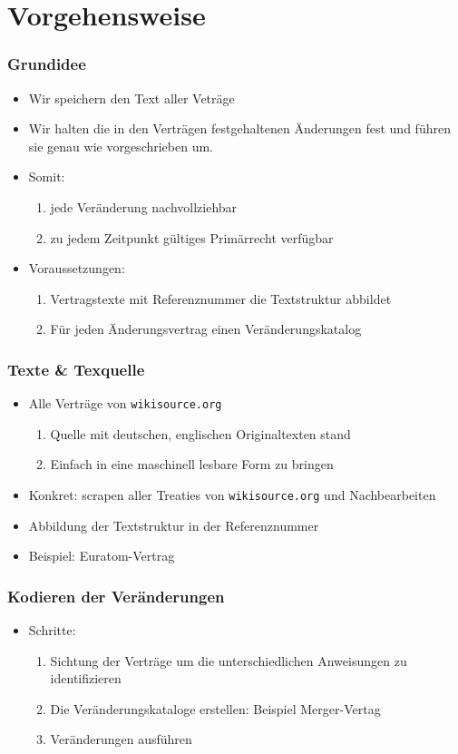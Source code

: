 \documentclass[xcolor=dvipsnames]{beamer} %
\begin{document}
\section{Vorgehensweise}
\begin{frame}
  \frametitle{Grundidee}
  \begin{itemize}
  \item Wir speichern den Text aller Veträge
  \item Wir halten die in den Verträgen festgehaltenen Änderungen fest und
   führen sie genau wie vorgeschrieben um. 
 \item Somit:
   \begin{enumerate}
   \item jede Veränderung nachvollziehbar
   \item zu jedem Zeitpunkt gültiges Primärrecht verfügbar
   \end{enumerate}
 \item Voraussetzungen:
   \begin{enumerate}
   \item Vertragstexte mit Referenznummer die Textstruktur abbildet
   \item Für jeden Änderungsvertrag einen Veränderungskatalog
   \end{enumerate}
  \end{itemize}
\end{frame}

\begin{frame}
  \frametitle{Texte \& Texquelle}
  \begin{itemize}
  \item Alle Verträge von \texttt{wikisource.org} 
    \begin{enumerate}
    \item Quelle mit deutschen, englischen Originaltexten stand
    \item Einfach in eine maschinell lesbare Form zu bringen
    \end{enumerate}
  \item Konkret: scrapen aller Treaties von \texttt{wikisource.org} und
    Nachbearbeiten
  \item Abbildung der Textstruktur in der Referenznummer
  \item Beispiel: Euratom-Vertrag
  \end{itemize}
\end{frame}

\begin{frame}
  \frametitle{Kodieren der Veränderungen}
  \begin{itemize}
  \item Schritte:
    \begin{enumerate}
    \item Sichtung der Verträge um die unterschiedlichen Anweisungen zu
      identifizieren
    \item Die Veränderungskataloge erstellen: Beispiel Merger-Vertag
    \item Veränderungen ausführen
    \end{enumerate}
  \end{itemize}
\end{frame}
\end{document}
